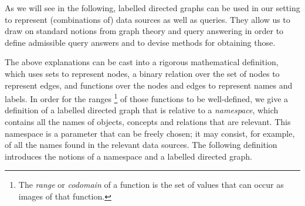 As we will see in the following, labelled directed graphs can be used in our setting
to represent (combinations of) data sources as well as queries.
They allow us to draw on standard notions from graph theory and query answering
in order to define admissible query answers and to devise methods for obtaining those.


The above explanations can be cast into a rigorous mathematical definition,
which uses sets to represent nodes, a binary relation over the set of nodes
to represent edges, and functions over the nodes and edges to represent
names and labels. In order for the ranges%
\footnote{The \emph{range} or \emph{codomain} of a function is the set of values that can occur as images of that function.}
of those functions to be well-defined,
we give a definition of a labelled directed graph that is relative to a \emph{namespace},
which contains all the names of objects, concepts and relations that are relevant.
This namespace is a parameter that can be freely chosen; it may consist,
for example, of all the names found in the relevant data sources.
The following definition introduces the notions of a namespace and a
labelled directed graph.
%
